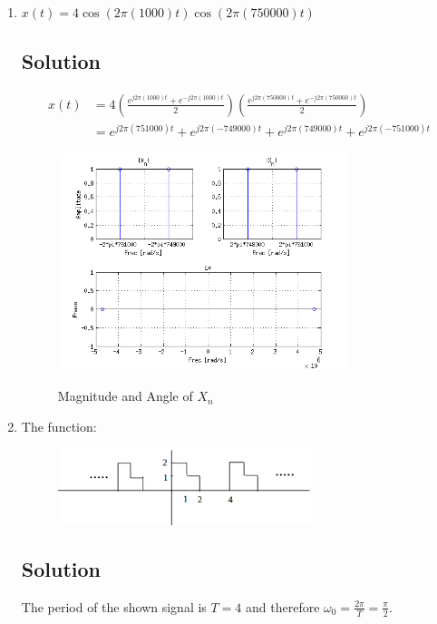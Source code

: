 \begin{enumerate}
\item $x(t) = 4 \cos(2\pi(1000)t)\cos(2\pi(750000)t)$
\subsection*{Solution}
\begin{equation*}
\begin{aligned}
 x(t) &= 4 \left( \frac{e^{j 2\pi(1000)t} + e^{-j 2\pi(1000)t}}{2} \right)
	  \left( \frac{e^{j 2\pi(750000)t} + e^{-j 2\pi(750000)t}}{2} \right) \\
 &= e^{j 2\pi(751000)t} + e^{j 2\pi(-749000)t} + e^{j 2\pi(749000)t} + e^{j 2\pi(-751000)t}
\end{aligned}
\end{equation*} 

\begin{figure}[H]
\caption{Magnitude and Angle of $X_n$}
\centering
\includegraphics[width=0.8\textwidth]{figs/c1p3b.png}
\label{fig:c1p3b}
\end{figure} 

\item The function:
\begin{figure}[H]
\caption*{}
\centering
\includegraphics[width=0.7\textwidth]{figs/c1p3e1.png}
\label{fig:c1p3e1}
\end{figure} 

\subsection*{Solution}
The period of the shown signal is $T=4$ and therefore $\omega_0 = \frac{2 \pi}{T} =  \frac{\pi}{2}$.


\end{enumerate}
